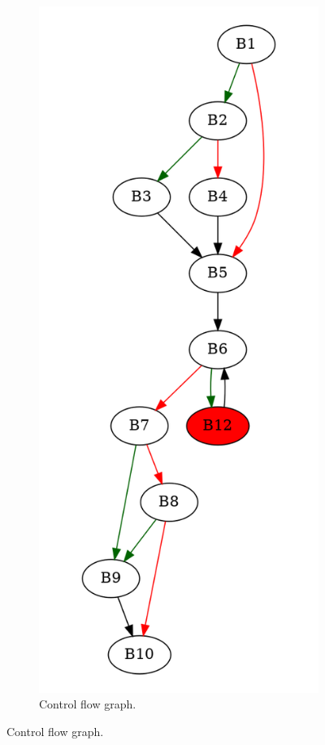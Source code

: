 \documentclass[aspectratio=1610]{beamer}
\begin{document}
\begin{frame}[noframenumbering]
\begin{figure}[htbp]
\begin{subfigure}[b]{0.50\textwidth}
			\includegraphics[height=0.7\paperheight]{inc/methods/hammock/counter-example/jump-threading-and-short-circuit/jump-threading-and-short-circuit_jump/f_0002b.png}
			\caption{Control flow graph.}
		\end{subfigure}
	\end{figure}
\end{frame}
\end{document}

